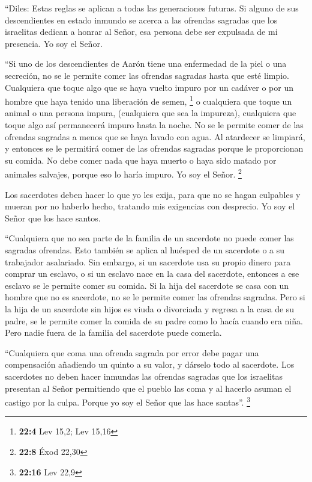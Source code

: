  ``Diles: Estas reglas se aplican a todas las generaciones
futuras. Si alguno de sus descendientes en estado inmundo se acerca a
las ofrendas sagradas que los israelitas dedican a honrar al Señor, esa
persona debe ser expulsada de mi presencia. Yo soy el Señor.

 ``Si uno de los descendientes de Aarón tiene una
enfermedad de la piel o una secreción, no se le permite comer las
ofrendas sagradas hasta que esté limpio. Cualquiera que toque algo que
se haya vuelto impuro por un cadáver o por un hombre que haya tenido una
liberación de semen, \footnote{\textbf{22:4} Lev 15,2; Lev 15,16}
 o cualquiera que toque un animal o una persona impura,
(cualquiera que sea la impureza),  cualquiera que toque
algo así permanecerá impuro hasta la noche. No se le permite comer de
las ofrendas sagradas a menos que se haya lavado con agua.
 Al atardecer se limpiará, y entonces se le permitirá
comer de las ofrendas sagradas porque le proporcionan su comida.
 No debe comer nada que haya muerto o haya sido matado por
animales salvajes, porque eso lo haría impuro. Yo soy el Señor.
\footnote{\textbf{22:8} Éxod 22,30}

 Los sacerdotes deben hacer lo que yo les exija, para que
no se hagan culpables y mueran por no haberlo hecho, tratando mis
exigencias con desprecio. Yo soy el Señor que los hace santos.

 ``Cualquiera que no sea parte de la familia de un
sacerdote no puede comer las sagradas ofrendas. Esto también se aplica
al huésped de un sacerdote o a su trabajador asalariado. 
Sin embargo, si un sacerdote usa su propio dinero para comprar un
esclavo, o si un esclavo nace en la casa del sacerdote, entonces a ese
esclavo se le permite comer su comida.  Si la hija del
sacerdote se casa con un hombre que no es sacerdote, no se le permite
comer las ofrendas sagradas.  Pero si la hija de un
sacerdote sin hijos es viuda o divorciada y regresa a la casa de su
padre, se le permite comer la comida de su padre como lo hacía cuando
era niña. Pero nadie fuera de la familia del sacerdote puede comerla.

 ``Cualquiera que coma una ofrenda sagrada por error debe
pagar una compensación añadiendo un quinto a su valor, y dárselo todo al
sacerdote.  Los sacerdotes no deben hacer inmundas las
ofrendas sagradas que los israelitas presentan al Señor 
permitiendo que el pueblo las coma y al hacerlo asuman el castigo por la
culpa. Porque yo soy el Señor que las hace santas''. \footnote{\textbf{22:16}
  Lev 22,9}

